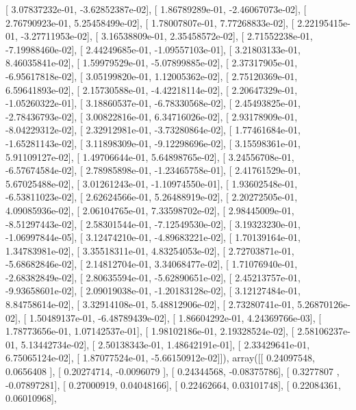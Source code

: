 \documentclass{article}
\begin{document}
       [ 3.07837232e-01, -3.62852387e-02],
       [ 1.86789289e-01, -2.46067073e-02],
       [ 2.76790923e-01,  5.25458499e-02],
       [ 1.78007807e-01,  7.77268833e-02],
       [ 2.22195415e-01, -3.27711953e-02],
       [ 3.16538809e-01,  2.35458572e-02],
       [ 2.71552238e-01, -7.19988460e-02],
       [ 2.44249685e-01, -1.09557103e-01],
       [ 3.21803133e-01,  8.46035841e-02],
       [ 1.59979529e-01, -5.07899885e-02],
       [ 2.37317905e-01, -6.95617818e-02],
       [ 3.05199820e-01,  1.12005362e-02],
       [ 2.75120369e-01,  6.59641893e-02],
       [ 2.15730588e-01, -4.42218114e-02],
       [ 2.20647329e-01, -1.05260322e-01],
       [ 3.18860537e-01, -6.78330568e-02],
       [ 2.45493825e-01, -2.78436793e-02],
       [ 3.00822816e-01,  6.34716026e-02],
       [ 2.93178909e-01, -8.04229312e-02],
       [ 2.32912981e-01, -3.73280864e-02],
       [ 1.77461684e-01, -1.65281143e-02],
       [ 3.11898309e-01, -9.12298696e-02],
       [ 3.15598361e-01,  5.91109127e-02],
       [ 1.49706644e-01,  5.64898765e-02],
       [ 3.24556708e-01, -6.57674584e-02],
       [ 2.78985898e-01, -1.23465758e-01],
       [ 2.41761529e-01,  5.67025488e-02],
       [ 3.01261243e-01, -1.10974550e-01],
       [ 1.93602548e-01, -6.53811023e-02],
       [ 2.62624566e-01,  5.26488919e-02],
       [ 2.20272505e-01,  4.09085936e-02],
       [ 2.06104765e-01,  7.33598702e-02],
       [ 2.98445009e-01, -8.51297443e-02],
       [ 2.58301544e-01, -7.12549530e-02],
       [ 3.19323230e-01, -1.06997844e-05],
       [ 3.12474210e-01, -4.89683221e-02],
       [ 1.70139164e-01,  1.34783981e-02],
       [ 3.35518311e-01,  4.83254053e-02],
       [ 2.72703871e-01, -5.68682846e-02],
       [ 2.14812704e-01,  3.34068477e-02],
       [ 1.71076940e-01, -2.68382849e-02],
       [ 2.80635594e-01, -5.62890651e-02],
       [ 2.45213757e-01, -9.93658601e-02],
       [ 2.09019038e-01, -1.20183128e-02],
       [ 3.12127484e-01,  8.84758614e-02],
       [ 3.32914108e-01,  5.48812906e-02],
       [ 2.73280741e-01,  5.26870126e-02],
       [ 1.50489137e-01, -6.48789439e-02],
       [ 1.86604292e-01,  4.24369766e-03],
       [ 1.78773656e-01,  1.07142537e-01],
       [ 1.98102186e-01,  2.19328524e-02],
       [ 2.58106237e-01,  5.13442734e-02],
       [ 2.50138343e-01,  1.48642191e-01],
       [ 2.33429641e-01,  6.75065124e-02],
       [ 1.87077524e-01, -5.66150912e-02]]), array([[ 0.24097548,  0.0656408 ],
       [ 0.20274714, -0.0096079 ],
       [ 0.24344568, -0.08375786],
       [ 0.3277807 , -0.07897281],
       [ 0.27000919,  0.04048166],
       [ 0.22462664,  0.03101748],
       [ 0.22084361,  0.06010968],
\end{document}
